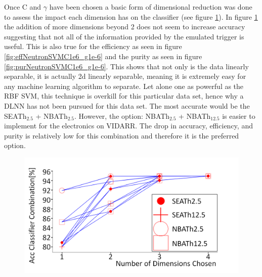 Once C and $\gamma$ have been chosen a basic form of dimensional reduction was done to assess the impact each dimension has on the classifier (see figure \ref{fig:accNeutronSVMC1e6_g1e-6}). In figure \ref{fig:accNeutronSVMC1e6_g1e-6} the addition of more dimensions beyond 2 does not seem to increase accuracy suggesting that not all of the information provided by the emulated trigger is useful. This is also true for the efficiency as seen in figure \ref{fig:effNeutronSVMC1e6_g1e-6} and the purity as seen in figure \ref{fig:purNeutronSVMC1e6_g1e-6}. This shows that not only is the data linearly separable, it is actually 2d linearly separable, meaning it is extremely easy for any machine learning algorithm to separate. Let alone one as powerful as the RBF SVM, this technique is overkill for this particular data set, hence why a DLNN has not been pursued for this data set. The most accurate would be the SEATh$_{2.5}$ + NBATh$_{2.5}$. However, the option: NBATh$_{2.5}$ + NBATh$_{12.5}$ is easier to implement for the electronics on VIDARR. The drop in accuracy, efficiency, and purity is relatively low for this combination and therefore it is the preferred option. 

\begin{figure}[!h]
\centering
\includegraphics[width=0.8\linewidth]{Chapter4/Figs/Raster/accNeutronSVMC1e6_g1e-6MedText.png}
\label{fig:accNeutronSVMC1e6_g1e-6}
\end{figure}

